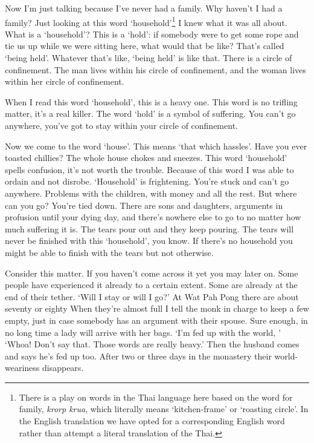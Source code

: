 Now I'm just talking because I've never had a family. Why haven't I had a family? Just looking at this word `household'\footnote{There is a play on words in the Thai language here based on the word for family, \textit{krorp krua}, which literally means `kitchen-frame' or `roasting circle'. In the English translation we have opted for a corresponding English word rather than attempt a literal translation of the Thai.} I knew what it was all about. What is a `household'? This is a `hold': if somebody were to get some rope and tie us up while we were sitting here, what would that be like? That's called `being held'. Whatever that's like, `being held' is like that. There is a circle of confinement. The man lives within his circle of confinement, and the woman lives within her circle of confinement.

When I read this word `household', this is a heavy one. This word is no trifling matter, it's a real killer. The word `hold' is a symbol of suffering. You can't go anywhere, you've got to stay within your circle of confinement.

Now we come to the word `house'. This means `that which hassles'. Have you ever toasted chillies? The whole house chokes and sneezes. This word `household' spells confusion, it's not worth the trouble. Because of this word I was able to ordain and not disrobe. `Household' is frightening. You're stuck and can't go anywhere. Problems with the children, with money and all the rest. But where can you go? You're tied down. There are sons and daughters, arguments in profusion until your dying day, and there's nowhere else to go to no matter how much suffering it is. The tears pour out and they keep pouring. The tears will never be finished with this `household', you know. If there's no household you might be able to finish with the tears but not otherwise.

Consider this matter. If you haven't come across it yet you may later on. Some people have experienced it already to a certain extent. Some are already at the end of their tether. `Will I stay or will I go?' At Wat Pah Pong there are about seventy or eighty  When they're almost full I tell the monk in charge to keep a few empty, just in case somebody has an argument with their spouse. Sure enough, in no long time a lady will arrive with her bags. `I'm fed up with the world, ' `Whoa! Don't say that. Those words are really heavy.' Then the husband comes and says he's fed up too. After two or three days in the monastery their world-weariness disappears.

